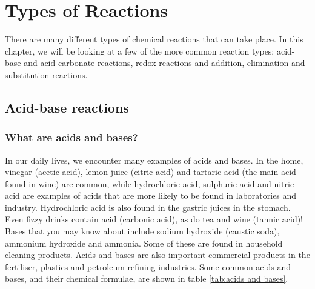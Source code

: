 \chapter{Types of Reactions}
\label{chap:reactiontypes}

There are many different types of chemical reactions that can take place. In this chapter, we will be looking at a few of the more common reaction types: acid-base and acid-carbonate reactions, redox reactions and addition, elimination and substitution reactions.



\section{Acid-base reactions}
\label{sec:reactiontypes:acid-base}

\subsection{What are acids and bases?}

In our daily lives, we encounter many examples of acids and bases. In the home, vinegar (acetic acid), lemon juice (citric acid) and tartaric acid (the main acid found in wine) are common, while hydrochloric acid, sulphuric acid and nitric acid are examples of acids that are more likely to be found in laboratories and industry. Hydrochloric acid is also found in the gastric juices in the stomach. Even fizzy drinks contain acid (carbonic acid), as do tea and wine (tannic acid)! Bases that you may know about include sodium hydroxide (caustic soda), ammonium hydroxide and ammonia. Some of these are found in household cleaning products. Acids and bases are also important commercial products in the fertiliser, plastics and petroleum refining industries. Some common acids and bases, and their chemical formulae, are shown in table \ref{tab:acids and bases}.

